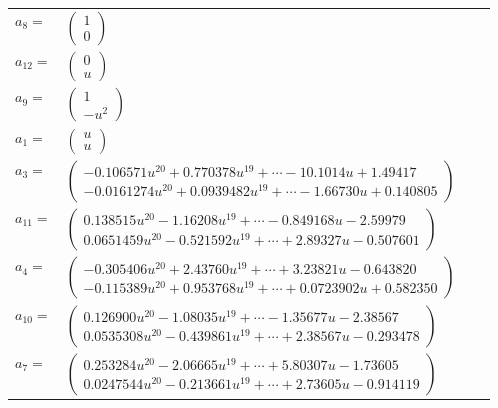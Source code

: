 \documentclass[1p]{elsarticle_modified}
\theoremstyle{definition}
\begin{document}
\begin{tabular}{m{7pt} m{180pt} m{7pt} m{180pt} }
\flushright $a_{8}=$&$\begin{pmatrix}1\\0\end{pmatrix}$ \\
\flushright $a_{12}=$&$\begin{pmatrix}0\\u\end{pmatrix}$ \\
\flushright $a_{9}=$&$\begin{pmatrix}1\\- u^2\end{pmatrix}$ \\
\flushright $a_{1}=$&$\begin{pmatrix}u\\u\end{pmatrix}$ \\
\flushright $a_{3}=$&$\begin{pmatrix}-0.106571 u^{20}+0.770378 u^{19}+\cdots-10.1014 u+1.49417\\-0.0161274 u^{20}+0.0939482 u^{19}+\cdots-1.66730 u+0.140805\end{pmatrix}$ \\
\flushright $a_{11}=$&$\begin{pmatrix}0.138515 u^{20}-1.16208 u^{19}+\cdots-0.849168 u-2.59979\\0.0651459 u^{20}-0.521592 u^{19}+\cdots+2.89327 u-0.507601\end{pmatrix}$ \\
\flushright $a_{4}=$&$\begin{pmatrix}-0.305406 u^{20}+2.43760 u^{19}+\cdots+3.23821 u-0.643820\\-0.115389 u^{20}+0.953768 u^{19}+\cdots+0.0723902 u+0.582350\end{pmatrix}$ \\
\flushright $a_{10}=$&$\begin{pmatrix}0.126900 u^{20}-1.08035 u^{19}+\cdots-1.35677 u-2.38567\\0.0535308 u^{20}-0.439861 u^{19}+\cdots+2.38567 u-0.293478\end{pmatrix}$ \\
\flushright $a_{7}=$&$\begin{pmatrix}0.253284 u^{20}-2.06665 u^{19}+\cdots+5.80307 u-1.73605\\0.0247544 u^{20}-0.213661 u^{19}+\cdots+2.73605 u-0.914119\end{pmatrix}$ \\

\end{tabular}
\end{document}
